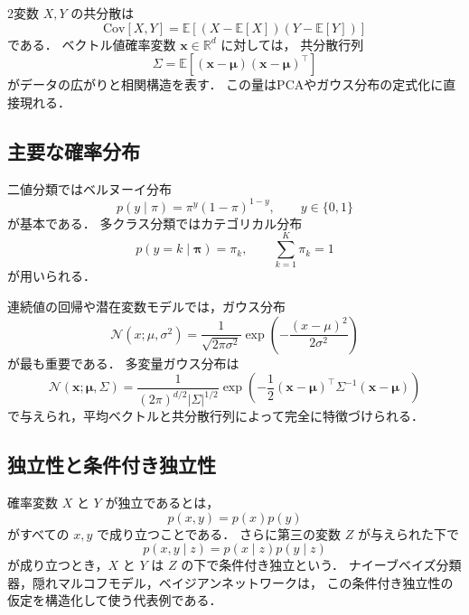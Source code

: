2変数 $X,Y$ の共分散は
\begin{equation}
  \mathrm{Cov}[X,Y]
  =
  \mathbb{E}\left[(X-\mathbb{E}[X])(Y-\mathbb{E}[Y])\right]
  \label{eq:covariance}
\end{equation}
である．
ベクトル値確率変数 $\boldsymbol{x} \in \mathbb{R}^{d}$ に対しては，
共分散行列
\begin{equation}
  \Sigma
  =
  \mathbb{E}
  \left[
    (\boldsymbol{x} - \boldsymbol{\mu})
    (\boldsymbol{x} - \boldsymbol{\mu})^{\top}
  \right]
  \label{eq:covariance-matrix}
\end{equation}
がデータの広がりと相関構造を表す．
この量はPCAやガウス分布の定式化に直接現れる．

\subsection{主要な確率分布}

二値分類ではベルヌーイ分布
\begin{equation}
  p(y \mid \pi) = \pi^{y}(1-\pi)^{1-y},
  \qquad y \in \{0,1\}
  \label{eq:bernoulli}
\end{equation}
が基本である．
多クラス分類ではカテゴリカル分布
\begin{equation}
  p(y=k \mid \boldsymbol{\pi}) = \pi_{k},
  \qquad
  \sum_{k=1}^{K}\pi_{k}=1
  \label{eq:categorical}
\end{equation}
が用いられる．

連続値の回帰や潜在変数モデルでは，ガウス分布
\begin{equation}
  \mathcal{N}(x;\mu,\sigma^{2})
  =
  \frac{1}{\sqrt{2\pi \sigma^{2}}}
  \exp\left(
    -\frac{(x-\mu)^{2}}{2\sigma^{2}}
  \right)
  \label{eq:gaussian}
\end{equation}
が最も重要である．
多変量ガウス分布は
\begin{equation}
  \mathcal{N}(\boldsymbol{x};\boldsymbol{\mu},\Sigma)
  =
  \frac{1}{(2\pi)^{d/2}|\Sigma|^{1/2}}
  \exp\left(
    -\frac{1}{2}
    (\boldsymbol{x}-\boldsymbol{\mu})^{\top}
    \Sigma^{-1}
    (\boldsymbol{x}-\boldsymbol{\mu})
  \right)
  \label{eq:multivariate-gaussian}
\end{equation}
で与えられ，平均ベクトルと共分散行列によって完全に特徴づけられる．

\subsection{独立性と条件付き独立性}

確率変数 $X$ と $Y$ が独立であるとは，
\begin{equation}
  p(x,y) = p(x)p(y)
  \label{eq:independence}
\end{equation}
がすべての $x,y$ で成り立つことである．
さらに第三の変数 $Z$ が与えられた下で
\begin{equation}
  p(x,y \mid z) = p(x \mid z)p(y \mid z)
  \label{eq:conditional-independence}
\end{equation}
が成り立つとき，$X$ と $Y$ は $Z$ の下で条件付き独立という．
ナイーブベイズ分類器，隠れマルコフモデル，ベイジアンネットワークは，
この条件付き独立性の仮定を構造化して使う代表例である．

